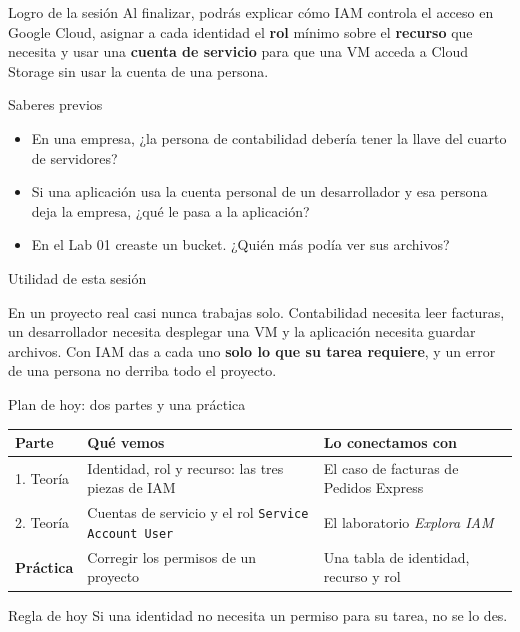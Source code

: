 \documentclass[aspectratio=169,10pt,c]{beamer}
\begin{document}
\begin{frame}[c]
\begin{block}{Logro de la sesión}
Al finalizar, podrás explicar cómo IAM controla el acceso en Google Cloud, asignar a cada identidad el \textbf{rol} mínimo sobre el \textbf{recurso} que necesita y usar una \textbf{cuenta de servicio} para que una VM acceda a Cloud Storage sin usar la cuenta de una persona.
\end{block}
\end{frame}

\begin{frame}{Saberes previos}
\begin{itemize}\setlength\itemsep{11pt}
  \item En una empresa, ¿la persona de contabilidad debería tener la llave del cuarto de servidores?
  \item Si una aplicación usa la cuenta personal de un desarrollador y esa persona deja la empresa, ¿qué le pasa a la aplicación?
  \item En el Lab 01 creaste un bucket. ¿Quién más podía ver sus archivos?
\end{itemize}
\end{frame}

\begin{frame}[c]{Utilidad de esta sesión}
\begin{center}
\begin{minipage}{.84\textwidth}
{\large En un proyecto real casi nunca trabajas solo. Contabilidad necesita leer facturas, un desarrollador necesita desplegar una VM y la aplicación necesita guardar archivos. Con IAM das a cada uno \textbf{solo lo que su tarea requiere}, y un error de una persona no derriba todo el proyecto.}
\end{minipage}
\end{center}
\end{frame}

\begin{frame}{Plan de hoy: dos partes y una práctica}
\renewcommand{\arraystretch}{1.35}
\centering\small
\begin{tabular}{@{}p{1.55cm}>{\raggedright\arraybackslash}p{5.8cm}>{\raggedright\arraybackslash}p{5.45cm}@{}}
\toprule
\textbf{Parte} & \textbf{Qué vemos} & \textbf{Lo conectamos con}\\
\midrule
1. Teoría & Identidad, rol y recurso: las tres piezas de IAM & El caso de facturas de Pedidos Express\\
2. Teoría & Cuentas de servicio y el rol \texttt{Service Account User} & El laboratorio \textit{Explora IAM}\\
\textbf{Práctica} & Corregir los permisos de un proyecto & Una tabla de identidad, recurso y rol\\
\bottomrule
\end{tabular}
\par\vspace{3mm}
\begin{alertblock}{Regla de hoy}
\small Si una identidad no necesita un permiso para su tarea, no se lo des.
\end{alertblock}
\end{frame}
\end{document}
